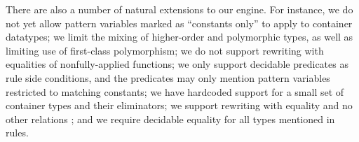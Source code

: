 \documentclass[a4paper,USenglish,cleveref,autoref,thm-restate]{lipics-v2021}
\begin{document}
There are also a number of natural extensions to our engine.
For instance, we do not yet allow pattern variables marked as ``constants only'' to apply to container datatypes; we limit the mixing of higher-order and polymorphic types, as well as limiting use of first-class polymorphism; we do not support rewriting with equalities of nonfully-applied functions; we only support decidable predicates as rule side conditions, and the predicates may only mention pattern variables restricted to matching constants; we have hardcoded support for a small set of container types and their eliminators; we support rewriting with equality and no other relations%
; and we require decidable equality for all types mentioned in rules.

\clearpage

\end{document}
